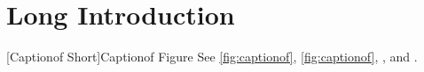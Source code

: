 \section[Short Intro]{Long Introduction}\label{sec:intro}
[Captionof Short]{Captionof Figure}\label{fig:captionof}
See \autoref{fig:captionof}, \cref{fig:captionof}, , and .
